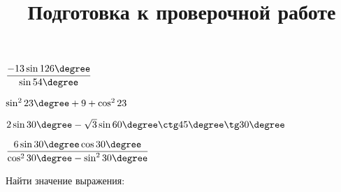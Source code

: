 \begin{class}[number=5]
\begin{listofex}
\begin{enumcols}[itemcolumns=2]
			\item \( \dfrac{-13\sin126\degree}{\sin54\degree} \)
			\item \( \sin^223\degree+9+\cos^223 \)
			\item \( 2\sin30\degree-\sqrt{3}\sin60\degree\ctg45\degree\tg30\degree\)
			\item \( \dfrac{6\sin30\degree\cos30\degree}{\cos^230\degree-\sin^230\degree} \)
		\end{enumcols}
		\item Найти значение выражения:
		\begin{enumcols}[itemcolumns=1]
			\item {}
			\item {}
			\item {}
			\item {}
		\end{enumcols}
	\end{listofex}
\end{class}
%
%
%	
%
%
%
\newpage
\title{Подготовка к проверочной работе}
